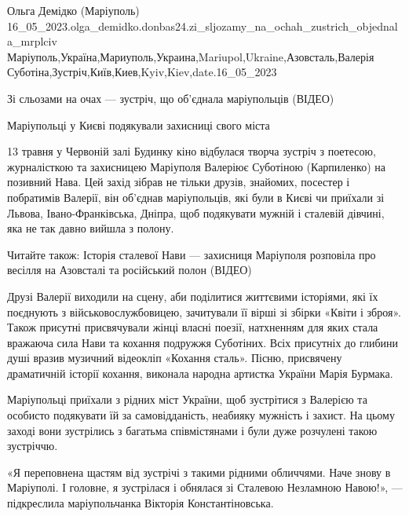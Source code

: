  
 
 
 
 

Ольга Демідко (Маріуполь)
16_05_2023.olga_demidko.donbas24.zi_sljozamy_na_ochah_zustrich_objednala_mrplciv
Маріуполь,Україна,Мариуполь,Украина,Mariupol,Ukraine,Азовсталь,Валерія Суботіна,Зустріч,Київ,Киев,Kyiv,Kiev,date.16_05_2023

Зі сльозами на очах — зустріч, що об'єднала маріупольців (ВІДЕО)

Маріупольці у Києві подякували захисниці свого міста

13 травня у Червоній залі Будинку кіно відбулася творча зустріч з поетесою,
журналісткою та захисницею Маріуполя Валеріює Суботіною (Карпиленко) на
позивний Нава. Цей захід зібрав не тільки друзів, знайомих, посестер і
побратимів Валерії, він об'єднав маріупольців, які були в Києві чи приїхали зі
Львова, Івано-Франківська, Дніпра, щоб подякувати мужній і сталевій дівчині,
яка не так давно вийшла з полону.

Читайте також: Історія сталевої Нави — захисниця Маріуполя розповіла про
весілля на Азовсталі та російський полон (ВІДЕО)

Друзі Валерії виходили на сцену, аби поділитися життєвими історіями, які їх
поєднують з військовослужбовицею, зачитували її вірші зі збірки «Квіти і
зброя». Також присутні присвячували жінці власні поезії, натхненням для яких
стала вражаюча сила Нави та кохання подружжя Суботіних. Всіх присутніх до
глибини душі вразив музичний відеокліп «Кохання сталь». Пісню, присвячену
драматичній історії кохання, виконала народна артистка України Марія Бурмака.

Маріупольці приїхали з рідних міст України, щоб зустрітися з Валерією та
особисто подякувати їй за самовідданість, неабияку мужність і захист. На цьому
заході вони зустрілись з багатьма співмістянами і були дуже розчулені такою
зустріччю.  

«Я переповнена щастям від зустрічі з такими рідними обличчями. Наче знову в
Маріуполі. І головне, я зустрілася і обнялася зі Сталевою Незламною Навою!», —
підкреслила маріупольчанка Вікторія Константіновська.

